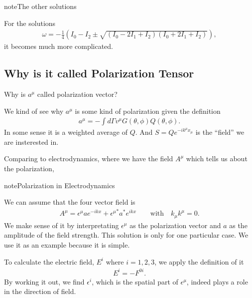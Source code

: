 \documentclass[letterpaper,12pt,english]{sphinxmanual}
\begin{document}
\begin{sphinxadmonition}{note}{The other solutions}

For the solutions
\begin{equation*}
\begin{split}\omega = -\frac{1}{4}\left(I_0-I_2\pm \sqrt{ (I_0-2I_1+I_2)(I_0+2I_1+I_2) }\right),\end{split}
\end{equation*}
it becomes much more complicated.
\end{sphinxadmonition}


\subsection{Why is it called Polarization Tensor}
\label{\detokenize{collective/dispersion-relation:why-is-it-called-polarization-tensor}}
Why is \(a^\mu\) called polarization vector?

We kind of see why \(a^\mu\) is some kind of polarization given the definition
\begin{equation*}
\begin{split}a^\mu = -\int d\Gamma v^\mu G(\theta,\phi) Q(\theta,\phi).\end{split}
\end{equation*}
In some sense it is a weighted average of \(Q\). And \(S = Q e^{-i k^\mu x_\mu}\) is the ``field'' we are insterested in.

Comparing to electrodynamics, where we have the field \(A^\mu\) which tells us about the polarization,

\begin{sphinxadmonition}{note}{Polarization in Electrodynamics}

We can assume that the four vector field is
\begin{equation*}
\begin{split}A^\mu = \epsilon^\mu a e^{-ikx} + {\epsilon^\mu}^*  a^* e^{ikx} \qquad \text{with}\quad k_\mu k^\mu =0.\end{split}
\end{equation*}
We make sense of it by interpretating \(\epsilon^\mu\) as the polarization vector and \(a\) as the amplitude of the field strength. This solution is only for one particular case. We use it as an example because it is simple.

To calculate the electric field, \(E^i\) where \(i=1,2,3\), we apply the definition of it
\begin{equation*}
\begin{split}E^i = - F^{0i}.\end{split}
\end{equation*}
By working it out, we find \(\epsilon^i\), which is the spatial part of \(\epsilon^\mu\), indeed plays a role in the direction of field.
\end{sphinxadmonition}
\end{document}
